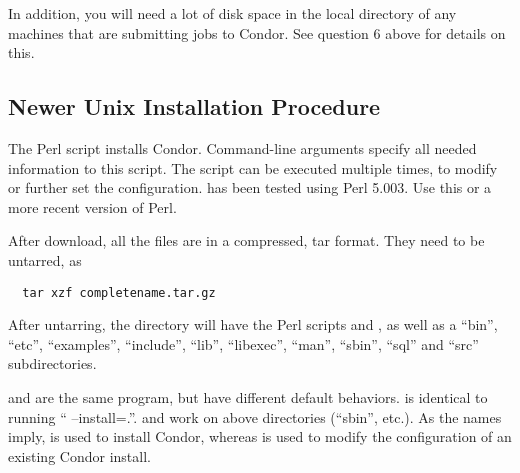 \begin{description}

In addition, you will need a lot of disk space in the local directory
of any machines that are submitting jobs to Condor.  See question 6
above for details on this.

\end{description}

\subsection{\label{sec:new-install-procedure}
Newer Unix Installation Procedure}

The Perl script  installs Condor.
Command-line arguments specify all needed information to this
script.  The script can be executed multiple times, to modify or further
set the configuration.   has been tested using Perl 5.003.
Use this or a more recent version of Perl.

After download, all the files are in a compressed, tar format.
They need to be untarred, as
\begin{verbatim}
  tar xzf completename.tar.gz
\end{verbatim}
After untarring, the directory will have the Perl scripts
 and , as well as a ``bin'', ``etc'',
``examples'', ``include'', ``lib'', ``libexec'', ``man'', ``sbin'',
``sql'' and ``src'' subdirectories.

 and  are the same program, but have
different default behaviors.   is identical to
running `` --install=.''.
 and  work on above directories
(``sbin'', etc.).  As the names imply,  is used to
install Condor, whereas  is used to modify the
configuration of an existing Condor install.

